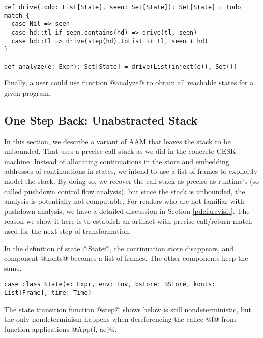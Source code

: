 \documentclass[acmsmall,review,anonymous]{acmart}\settopmatter{printfolios=true,printccs=false,printacmref=false}
\begin{document}
\begin{lstlisting}
def drive(todo: List[State], seen: Set[State]): Set[State] = todo match {
  case Nil => seen
  case hd::tl if seen.contains(hd) => drive(tl, seen)
  case hd::tl => drive(step(hd).toList ++ tl, seen + hd)
}

def analyze(e: Expr): Set[State] = drive(List(inject(e)), Set())
\end{lstlisting}

Finally, a user could use function @analyze@ to obtain all reachable states for a given program.


\subsection{One Step Back: Unabstracted Stack}

In this section, we describe a variant of AAM that leaves the stack to be
unbounded. That uses a precise call stack as we did in the concrete CESK machine.
Instead of allocating continuations in the store and embedding
addresses of continuations in states, we intend to use a list of frames
to explicitly model the stack.
By doing so, we recover the call stack as precise as runtime's
(so called pushdown control flow analysis), but since
the stack is unbounded, the analysis is potentially not computable.
For readers who are not familiar with pushdown analysis, we have a detailed
discussion in Section \ref{pdcfarevisit}.
The reason we show it here is to establish an artifact with precise call/return match
used for the next step of transformation.

In the definition of state @State@, the continuation store disappears, and
component @konts@ becomes a list of frames. The other components keep the same.

\begin{lstlisting}
case class State(e: Expr, env: Env, bstore: BStore, konts: List[Frame], time: Time)
\end{lstlisting}

The state transition function @step@ shows below is still
nondeterministic, but the only nondeterminism happens when dereferencing the callee @f@
from function applications @App(f, ae)@.
\end{document}
